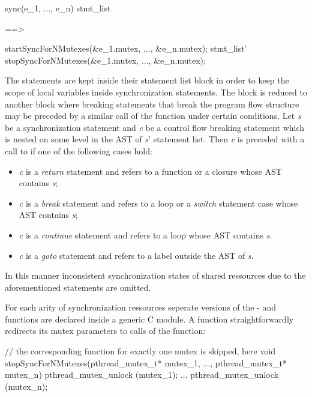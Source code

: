 \begin{center}
\begin{minipage}{0.4\textwidth}
\begin{ccode}
sync(e_1, ..., e_n) stmt_list
\end{ccode}
\end{minipage}
\qquad==>\qquad
\begin{minipage}{0.4\textwidth}
\begin{ccode}
startSyncForNMutexes(&e_1.mutex, ..., &e_n.mutex);
stmt_list'
stopSyncForNMutexes(&e_1.mutex, ..., &e_n.mutex);
\end{ccode}
\end{minipage}
\end{center}

The statements are kept inside their statement list block in order to keep the scope of local variables inside synchronization statements. The block is reduced to another block where breaking statements that break the program flow structure may be preceded by a similar call of the  function under certain conditions. Let \textit{s} be a synchronization statement and \textit{c} be a control flow breaking statement which is nested on some level in the AST of \textit{s}' statement list. Then \textit{c} is preceded with a call to  if one of the following cases hold:
\begin{itemize}
\item \textit{c} is a \textit{return} statement and refers to a function or a closure whose AST contains \textit{s};
\item \textit{c} is a \textit{break} statement and refers to a loop or a \textit{switch} statement case whose AST contains \textit{s};
\item \textit{c} is a \textit{continue} statement and refers to a loop whose AST contains \textit{s}.
\item \textit{c} is a \textit{goto} statement and refers to a label outside the AST of \textit{s}.
\end{itemize}
In this manner inconsistent synchronization states of shared ressources due to the aforementioned statements are omitted. 

For each arity of synchronization ressources seperate versions of the - and  functions are declared inside a generic C module. A  function straightforwardly redirects its mutex parameters to calls of the  function:
\begin{ccode}
// the corresponding function for exactly one mutex is skipped, here
void stopSyncForNMutexes(pthread_mutex_t* mutex_1, ..., pthread_mutex_t* mutex_n) { 
  pthread_mutex_unlock (mutex_1);
  ...
  pthread_mutex_unlock (mutex_n); 
}
\end{ccode}

